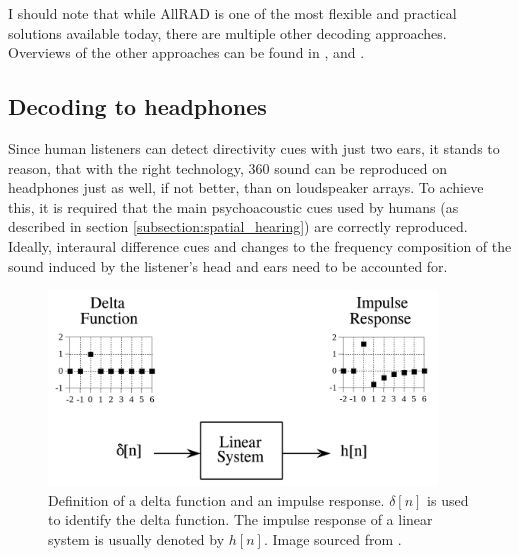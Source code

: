 I should note that while AllRAD is one of the most flexible and practical solutions available today,
there are multiple other decoding approaches. Overviews of the other approaches can be found in
\cite{ambisonics_practical_theory}, \cite{frank_and_franz_producing_in_ambisonics} and \cite{ambisonic_decoders_slides_stanford}.

\subsection{Decoding to headphones}

Since human listeners can detect directivity cues with just two ears, it stands to reason, that with the right 
technology, 360\degree{} sound can be reproduced on headphones just as well, if not better, than on loudspeaker arrays.
To achieve this, it is required that the main psychoacoustic cues used by humans (as described in section \ref{subsection:spatial_hearing})
are correctly reproduced. Ideally, interaural difference cues
and changes to the frequency composition of the sound induced by the listener's
head and ears need to be accounted for.

\begin{figure}[!ht]
    \centering
    \includegraphics[height=14em]{images/spatial_audio/impulse_response.png}
    \caption{Definition of a delta function and an impulse response. $\delta[n]$ is used to identify the delta function. 
        The impulse response of a linear system is usually denoted by $h[n]$.
        Image sourced from \cite{dsp_book_convolution}. \label{fig:imp_resp_delta_func}}
\end{figure}

